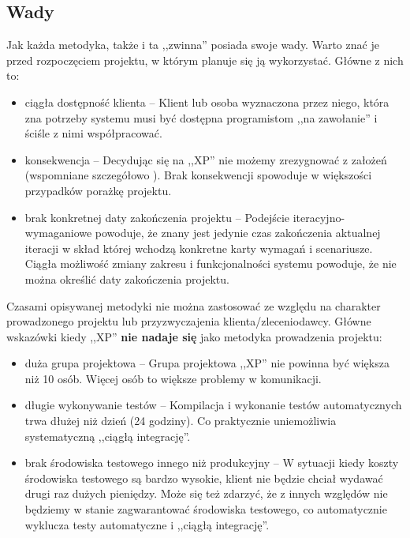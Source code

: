 \subsection{Wady}
\label{sec:ZMTOwady}

Jak każda metodyka, także i ta ,,zwinna'' posiada swoje wady. Warto znać je przed rozpoczęciem projektu, w którym planuje się ją wykorzystać. Główne z nich to:

\begin{itemize}
    \item ciągła dostępność klienta -- Klient lub osoba wyznaczona przez niego, która zna potrzeby systemu musi być dostępna programistom ,,na zawołanie'' i ściśle z nimi współpracować.
    \item konsekwencja -- Decydując się na ,,XP'' nie możemy zrezygnować z założeń (wspomniane szczegółowo ). Brak konsekwencji spowoduje w większości przypadków porażkę projektu.
    \item brak konkretnej daty zakończenia projektu -- Podejście iteracyjno-wymaganiowe powoduje, że znany jest jedynie czas zakończenia aktualnej iteracji w skład której wchodzą konkretne karty wymagań i scenariusze. Ciągła możliwość zmiany zakresu i funkcjonalności systemu powoduje, że nie można określić daty zakończenia projektu.
\end{itemize}

Czasami opisywanej metodyki nie można zastosować ze względu na charakter prowadzonego projektu lub przyzwyczajenia klienta/zleceniodawcy. Główne wskazówki kiedy ,,XP'' \textbf{nie nadaje się} jako metodyka prowadzenia projektu:

\begin{itemize}
    \item duża grupa projektowa -- Grupa projektowa ,,XP'' nie powinna być większa niż 10 osób. Więcej osób to większe problemy w komunikacji.
    \item długie wykonywanie testów -- Kompilacja i wykonanie testów automatycznych trwa dłużej niż dzień (24 godziny). Co praktycznie uniemożliwia systematyczną ,,ciągłą integrację''.
    \item brak środowiska testowego innego niż produkcyjny -- W sytuacji kiedy koszty środowiska testowego są bardzo wysokie, klient nie będzie chciał wydawać drugi raz dużych pieniędzy. Może się też zdarzyć, że z innych względów nie będziemy w stanie zagwarantować środowiska testowego, co automatycznie wyklucza testy automatyczne i ,,ciągłą integrację''.
\end{itemize}


